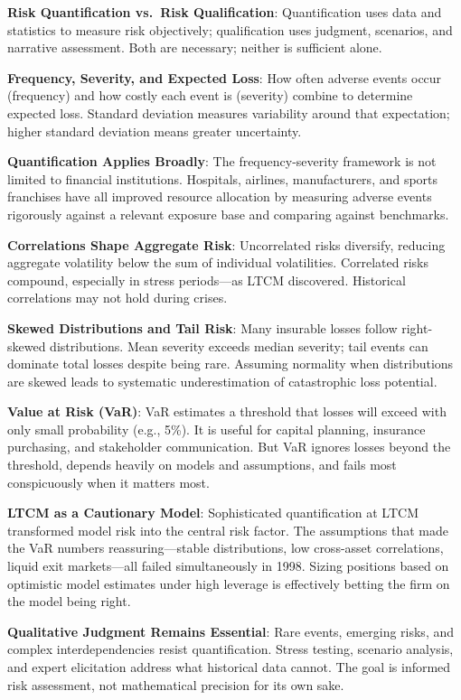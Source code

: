 \documentclass[11pt,openany]{book}
\begin{document}
\begin{keytakeaways}
\item
  \textbf{Risk Quantification vs.\ Risk Qualification}: Quantification uses
  data and statistics to measure risk objectively; qualification uses judgment,
  scenarios, and narrative assessment. Both are necessary; neither is
  sufficient alone.
\item
  \textbf{Frequency, Severity, and Expected Loss}: How often adverse events
  occur (frequency) and how costly each event is (severity) combine to
  determine expected loss. Standard deviation measures variability around that
  expectation; higher standard deviation means greater uncertainty.
\item
  \textbf{Quantification Applies Broadly}: The frequency-severity framework is
  not limited to financial institutions. Hospitals, airlines, manufacturers,
  and sports franchises have all improved resource allocation by measuring
  adverse events rigorously against a relevant exposure base and comparing
  against benchmarks.
\item
  \textbf{Correlations Shape Aggregate Risk}: Uncorrelated risks diversify,
  reducing aggregate volatility below the sum of individual volatilities.
  Correlated risks compound, especially in stress periods---as LTCM
  discovered. Historical correlations may not hold during crises.
\item
  \textbf{Skewed Distributions and Tail Risk}: Many insurable losses follow
  right-skewed distributions. Mean severity exceeds median severity; tail
  events can dominate total losses despite being rare. Assuming normality when
  distributions are skewed leads to systematic underestimation of catastrophic
  loss potential.
\item
  \textbf{Value at Risk (VaR)}: VaR estimates a threshold that losses will
  exceed with only small probability (e.g., 5\%). It is useful for capital
  planning, insurance purchasing, and stakeholder communication. But VaR
  ignores losses beyond the threshold, depends heavily on models and
  assumptions, and fails most conspicuously when it matters most.
\item
  \textbf{LTCM as a Cautionary Model}: Sophisticated quantification at LTCM
  transformed model risk into the central risk factor. The assumptions that
  made the VaR numbers reassuring---stable distributions, low cross-asset
  correlations, liquid exit markets---all failed simultaneously in 1998. Sizing
  positions based on optimistic model estimates under high leverage is
  effectively betting the firm on the model being right.
\item
  \textbf{Qualitative Judgment Remains Essential}: Rare events, emerging risks,
  and complex interdependencies resist quantification. Stress testing, scenario
  analysis, and expert elicitation address what historical data cannot. The
  goal is informed risk assessment, not mathematical precision for its own
  sake.
\end{keytakeaways}
\end{document}
